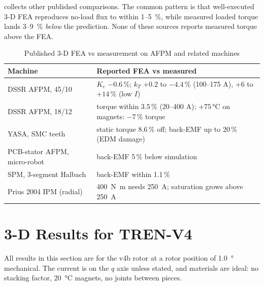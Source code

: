 \documentclass[journal]{IEEEtran}
\newcommand{\Nm}{\si{\newton\metre}}
\begin{document}
 collects other published comparisons. The common pattern is that well-executed 3-D FEA reproduces no-load flux to within 1--\SI{5}{\percent}, while measured loaded torque lands 3--\SI{9}{\percent} \emph{below} the prediction. None of these sources reports measured torque above the FEA.

\begin{table}[!t]
\caption{Published 3-D FEA vs measurement on AFPM and related machines}\label{tab:lit}
\centering\footnotesize
\begin{tabular}{@{}>{\raggedright}p{32mm}>{\raggedright\arraybackslash}p{45mm}@{}}
\toprule
Machine & Reported FEA vs measured\\
\midrule
DSSR AFPM, 45/10 \cite{bench2122} & $K_e$ $-0.6$\,\%; $k_T$ $+0.2$ to $-4.4$\,\% (100--175 A), $+6$ to $+14$\,\% (low $I$)\\
DSSR AFPM, 18/12 \cite{stet2026} & torque within 3.5\,\% (20--400 A); $+75$\,\si{\celsius} on magnets: $-7$\,\% torque\\
YASA, SMC teeth \cite{yasa2025} & static torque 8.6\,\% off; back-EMF up to 20\,\% (EDM damage)\\
PCB-stator AFPM, micro-robot \cite{pcb2025} & back-EMF 5\,\% below simulation\\
SPM, 3-segment Halbach \cite{wevj2025} & back-EMF within 1.1\,\%\\
Prius 2004 IPM (radial) \cite{ornl2005} & \SI{400}{\Nm} needs \SI{250}{A}; saturation grows above \SI{250}{A}\\
\bottomrule
\end{tabular}
\end{table}

\section{3-D Results for TREN-V4}\label{sec:results}
All results in this section are for the v4b rotor at a rotor position of \SI{1.0}{\degree} mechanical. The current is on the $q$ axis unless stated, and materials are ideal: no stacking factor, \SI{20}{\celsius} magnets, no joints between pieces.
\end{document}
